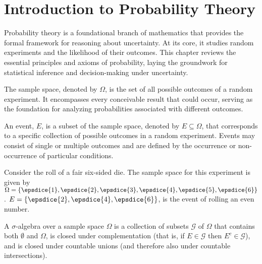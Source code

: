 \chapter{Introduction to Probability Theory}
\label{chp:probaiblity_theory}
Probability theory is a foundational branch of mathematics that provides the formal framework for reasoning about uncertainty. At its core, it studies random experiments and the likelihood of their outcomes. This chapter reviews the essential principles and axioms of probability, laying the groundwork for statistical inference and decision-making under uncertainty.

\begin{definition}
	\label{def:sample_space}
	The sample space, denoted by $\Omega$, is the set of all possible outcomes of a random experiment. It encompasses every conceivable result that could occur, serving as the foundation for analyzing probabilities associated with different outcomes.
\end{definition}

\begin{definition}[Event]
	An event, $E$, is a subset of the sample space, denoted by $E \subseteq \Omega$, that corresponds to a specific collection of possible outcomes in a random experiment. Events may consist of single or multiple outcomes and are defined by the occurrence or non-occurrence of particular conditions.
\end{definition}

\begin{example}
	\label{ex:die1}
	Consider the roll of a fair six-sided die. The sample space for this experiment is given by $\Omega = \{ \epsdice{1}, \epsdice{2}, \epsdice{3}, \epsdice{4}, \epsdice{5}, \epsdice{6} \}$. $E = \{\epsdice{2}, \epsdice{4}, \epsdice{6}\}$, is the event of rolling an even number. 
\end{example}

\begin{definition}
	\label{def:sigma_algebra}
	A $\sigma$-algebra over a sample space $\Omega$ is a collection of subsets $\mathcal{G}$ of $\Omega$ that contains both $\emptyset$ and $\Omega$, is closed under complementation (that is, if $E \in \mathcal{G}$ then $E^c \in \mathcal{G}$), and is closed under countable unions (and therefore also under countable intersections).
\end{definition}


